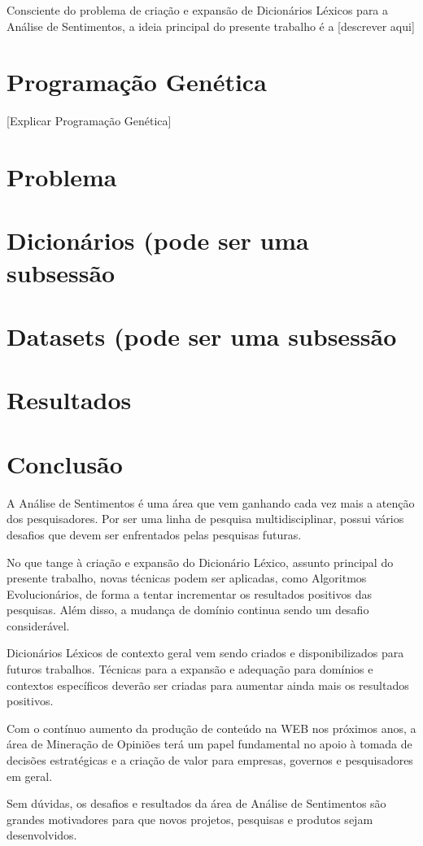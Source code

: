 \documentclass[12pt]{article}
\begin{document}
Consciente do problema de criação e expansão de Dicionários Léxicos para a Análise de Sentimentos, a ideia principal do presente trabalho é a [descrever aqui]

\section{Programação Genética}
[Explicar Programação Genética]

\section{Problema}

\section{Dicionários (pode ser uma subsessão}

\section{Datasets (pode ser uma subsessão}

\section{Resultados}

\section{Conclusão}\label{conclusion}

A Análise de Sentimentos é uma área que vem ganhando cada vez mais a atenção dos pesquisadores. Por ser uma linha de pesquisa multidisciplinar, possui vários desafios que devem ser enfrentados pelas pesquisas futuras.

No que tange à criação e expansão do Dicionário Léxico, assunto principal do presente trabalho, novas técnicas podem ser aplicadas, como Algoritmos Evolucionários, de forma a tentar incrementar os resultados positivos das pesquisas. Além disso, a mudança de domínio continua sendo um desafio considerável.

Dicionários Léxicos de contexto geral vem sendo criados e disponibilizados para futuros trabalhos. Técnicas para a expansão e adequação para domínios e contextos específicos deverão ser criadas para aumentar ainda mais os resultados positivos.

Com o contínuo aumento da produção de conteúdo na WEB nos próximos anos, a área de Mineração de Opiniões terá um papel fundamental no apoio à tomada de decisões estratégicas e a criação de valor para empresas, governos e pesquisadores em geral. 

Sem dúvidas, os desafios e resultados da área de Análise de Sentimentos são grandes motivadores para que novos projetos, pesquisas e produtos sejam desenvolvidos.



\end{document}
